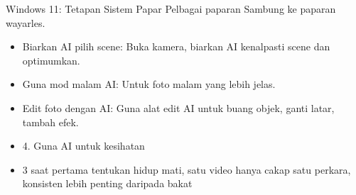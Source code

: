 \begin{tcbsummary}{Windows 11: Tetapan Sistem Papar Pelbagai paparan Sambung ke paparan wayarles.}
\begin{itemize}
  \item Biarkan AI pilih scene: Buka kamera, biarkan AI kenalpasti scene dan optimumkan.
  \item Guna mod malam AI: Untuk foto malam yang lebih jelas.
  \item Edit foto dengan AI: Guna alat edit AI untuk buang objek, ganti latar, tambah efek.
  \item 4. Guna AI untuk kesihatan
  \item 3 saat pertama tentukan hidup mati, satu video hanya cakap satu perkara, konsisten lebih penting daripada bakat
\end{itemize}

\end{tcbsummary}
